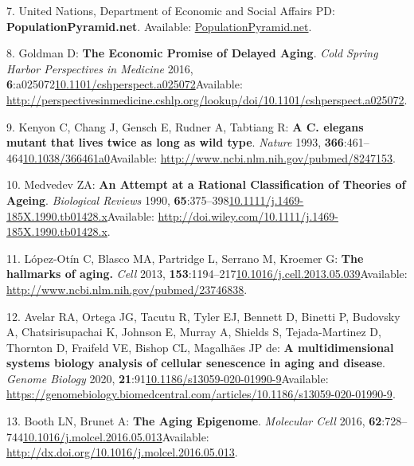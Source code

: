 \documentclass[
]{book}
\begin{document}
\leavevmode\hypertarget{ref-PopulationPyramid2019}{}%
7. United Nations, Department of Economic and Social Affairs PD: \textbf{PopulationPyramid.net}. Available: \url{PopulationPyramid.net}.

\leavevmode\hypertarget{ref-Goldman2016}{}%
8. Goldman D: \textbf{The Economic Promise of Delayed Aging}. \emph{Cold Spring Harbor Perspectives in Medicine} 2016, \textbf{6}:a025072\href{https://doi.org/10.1101/cshperspect.a025072}{10.1101/cshperspect.a025072}Available: \url{http://perspectivesinmedicine.cshlp.org/lookup/doi/10.1101/cshperspect.a025072}.

\leavevmode\hypertarget{ref-Kenyon1993}{}%
9. Kenyon C, Chang J, Gensch E, Rudner A, Tabtiang R: \textbf{A C. elegans mutant that lives twice as long as wild type}. \emph{Nature} 1993, \textbf{366}:461--464\href{https://doi.org/10.1038/366461a0}{10.1038/366461a0}Available: \url{http://www.ncbi.nlm.nih.gov/pubmed/8247153}.

\leavevmode\hypertarget{ref-Medvedev1990}{}%
10. Medvedev ZA: \textbf{An Attempt at a Rational Classification of Theories of Ageing}. \emph{Biological Reviews} 1990, \textbf{65}:375--398\href{https://doi.org/10.1111/j.1469-185X.1990.tb01428.x}{10.1111/j.1469-185X.1990.tb01428.x}Available: \url{http://doi.wiley.com/10.1111/j.1469-185X.1990.tb01428.x}.

\leavevmode\hypertarget{ref-Lopez-Otin2013}{}%
11. López-Otín C, Blasco MA, Partridge L, Serrano M, Kroemer G: \textbf{The hallmarks of aging.} \emph{Cell} 2013, \textbf{153}:1194--217\href{https://doi.org/10.1016/j.cell.2013.05.039}{10.1016/j.cell.2013.05.039}Available: \url{http://www.ncbi.nlm.nih.gov/pubmed/23746838}.

\leavevmode\hypertarget{ref-Avelar2020}{}%
12. Avelar RA, Ortega JG, Tacutu R, Tyler EJ, Bennett D, Binetti P, Budovsky A, Chatsirisupachai K, Johnson E, Murray A, Shields S, Tejada-Martinez D, Thornton D, Fraifeld VE, Bishop CL, Magalhães JP de: \textbf{A multidimensional systems biology analysis of cellular senescence in aging and disease}. \emph{Genome Biology} 2020, \textbf{21}:91\href{https://doi.org/10.1186/s13059-020-01990-9}{10.1186/s13059-020-01990-9}Available: \url{https://genomebiology.biomedcentral.com/articles/10.1186/s13059-020-01990-9}.

\leavevmode\hypertarget{ref-Booth2016}{}%
13. Booth LN, Brunet A: \textbf{The Aging Epigenome}. \emph{Molecular Cell} 2016, \textbf{62}:728--744\href{https://doi.org/10.1016/j.molcel.2016.05.013}{10.1016/j.molcel.2016.05.013}Available: \url{http://dx.doi.org/10.1016/j.molcel.2016.05.013}.
\end{document}
